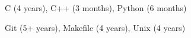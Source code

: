 
\begin{cvskills}
        {C (4 years), C++ (3 months), Python (6 months)} %
        
        {Git (5+ years), Makefile (4 years), Unix (4 years)}
\end{cvskills}
